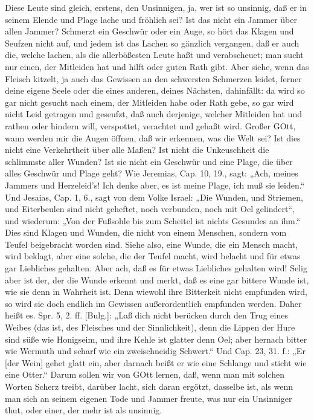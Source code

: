 Diese Leute sind gleich, erstens, den Unsinnigen, ja, wer ist so unsinnig, daß er in seinem Elende und Plage lache und fröhlich sei? Ist das nicht ein Jammer über allen Jammer? Schmerzt ein Geschwür oder ein Auge, so hört das Klagen und Seufzen nicht auf, und jedem ist das Lachen so gänzlich vergangen, daß er auch die, welche lachen, als die allerbößesten Leute haßt und verabscheuet; man sucht nur einen, der Mitleiden hat und hilft oder guten Rath gibt. Aber siehe, wenn das Fleisch kitzelt, ja auch das Gewissen an den schwersten Schmerzen leidet, ferner deine eigene Seele oder die eines anderen, deines Nächsten, dahinfällt: da wird so gar nicht gesucht nach einem, der Mitleiden habe oder Rath gebe, so gar wird nicht Leid getragen und geseufzt, daß auch derjenige, welcher Mitleiden hat und rathen oder hindern will, verspottet, verachtet und gehaßt wird. Großer GOtt, wann werden mir die Augen öffnen, daß wir erkennen, was die Welt sei? Ist dies nicht eine Verkehrtheit über alle Maßen? Ist nicht die Unkeuschheit die schlimmste aller Wunden? Ist sie nicht ein Geschwür und eine Plage, die über alles Geschwür und Plage geht? Wie Jeremias, Cap. 10, 19., sagt: „Ach, meines Jammers und Herzeleid's! Ich denke aber, es ist meine Plage, ich muß sie leiden.“ Und Jesaias, Cap. 1, 6., sagt von dem Volke Israel: „Die Wunden, und Striemen, und Eiterbeulen sind nicht geheftet, noch verbunden, noch mit Oel gelindert“, und wiederum: „Von der Fußsohle bis zum Scheitel ist nichts Gesundes an ihm.“ Dies sind Klagen und Wunden, die nicht von einem Menschen, sondern vom Teufel beigebracht worden sind. Siehe also, eine Wunde, die ein Mensch macht, wird beklagt, aber eine solche, die der Teufel macht, wird belacht und für etwas gar Liebliches gehalten. Aber ach, daß es für etwas Liebliches gehalten wird! Selig aber ist der, der die Wunde erkennt und merkt, daß es eine gar bittere Wunde ist, wie sie denn in Wahrheit ist. Denn wiewohl ihre Bitterkeit nicht empfunden wird, so wird sie doch endlich im Gewissen außerordentlich
empfunden werden. Daher heißt es. Spr. 5, 2. ff. [Bulg.]: „Laß dich nicht berücken durch den Trug eines Weibes (das ist, des Fleisches und der Sinnlichkeit), denn die Lippen der Hure sind süße wie Honigseim, und ihre Kehle ist glatter denn Oel; aber hernach bitter wie Wermuth und scharf wie ein zweischneidig Schwert.“ Und Cap. 23, 31. f.: „Er [der Wein] gehet glatt ein, aber darnach beißt er wie eine Schlange und sticht wie eine Otter.“ Darum sollen wir von GOtt lernen, daß, wenn man mit solchen Worten Scherz treibt, darüber lacht, sich daran ergötzt, dasselbe ist, als wenn man sich an seinem eigenen Tode und Jammer freute, was nur ein Unsinniger thut, oder einer, der mehr ist als unsinnig.

